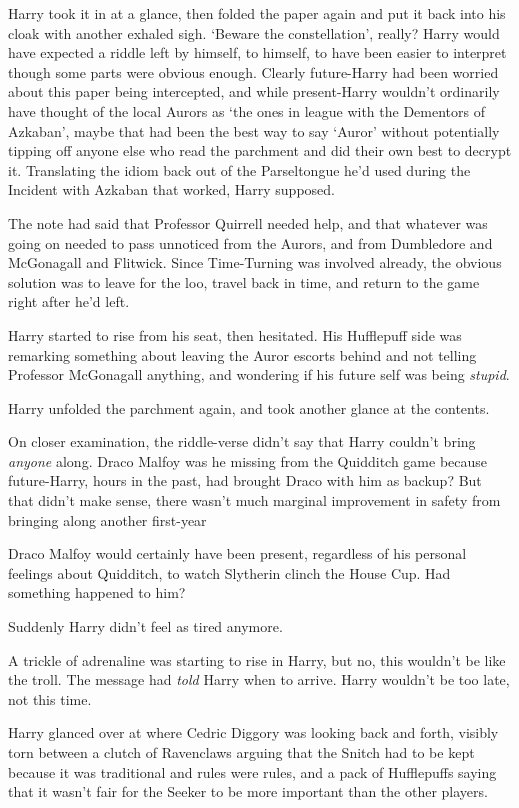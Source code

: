 Harry took it in at a glance, then folded the paper again and put it back into
his cloak with another exhaled sigh. `Beware the constellation', really? Harry
would have expected a riddle left by himself, to himself, to have been easier
to interpret{\el} though some parts were obvious enough. Clearly
future-Harry had been worried about this paper being intercepted, and while
present-Harry wouldn't ordinarily have thought of the local Aurors as `the ones
in league with the Dementors of Azkaban', maybe that had been the best way to
say `Auror' without potentially tipping off anyone else who read the parchment
and did their own best to decrypt it. Translating the idiom back out of the
Parseltongue he'd used during the Incident with Azkaban{\el} that worked,
Harry supposed.

The note had said that Professor Quirrell needed help, and that whatever was
going on needed to pass unnoticed from the Aurors, and from Dumbledore and
McGonagall and Flitwick. Since Time-Turning was involved already, the obvious
solution was to leave for the loo, travel back in time, and return to the game
right after he'd left.

Harry started to rise from his seat, then hesitated. His Hufflepuff side was
remarking something about leaving the Auror escorts behind and not telling
Professor McGonagall anything, and wondering if his future self was being
\emph{stupid}.

Harry unfolded the parchment again, and took another glance at the contents.

On closer examination, the riddle-verse didn't say that Harry couldn't bring
\emph{anyone} along. Draco Malfoy{\el} was he missing from the Quidditch
game because future-Harry, hours in the past, had brought Draco with him as
backup? But that didn't make sense, there wasn't much marginal improvement in
safety from bringing along another first-year{\el}

{\el} Draco Malfoy would certainly have been present, regardless of his
personal feelings about Quidditch, to watch Slytherin clinch the House Cup. Had
something happened to him?

Suddenly Harry didn't feel as tired anymore.

A trickle of adrenaline was starting to rise in Harry, but no, this wouldn't be
like the troll. The message had \emph{told} Harry when to arrive. Harry
wouldn't be too late, not this time.

Harry glanced over at where Cedric Diggory was looking back and forth, visibly
torn between a clutch of Ravenclaws arguing that the Snitch had to be kept
because it was traditional and rules were rules, and a pack of Hufflepuffs
saying that it wasn't fair for the Seeker to be more important than the other
players.

